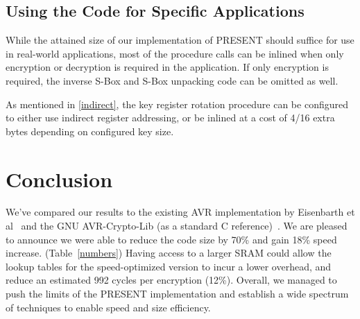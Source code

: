 \documentclass[11pt]{llncs2e} %
\begin{document}
\subsection{Using the Code for Specific Applications}
While the attained size of our implementation of PRESENT should suffice for use in real-world applications, most of the procedure calls can be inlined when only encryption or decryption is required in the application.
If only encryption is required, the inverse S-Box and  S-Box unpacking code can be omitted as well.


As mentioned in \ref{indirect}, the key register rotation procedure can be configured to either use indirect register addressing, or be inlined at a cost of 4/16 extra bytes depending on configured key size.

\section{Conclusion}
We've compared our results to the existing AVR implementation by Eisenbarth et al~\cite{eisenbarth2012compact} and the GNU AVR-Crypto-Lib (as a standard C reference)~\cite{avr_crypto_lib}.
We are pleased to announce we were able to reduce the code size by 70\% and gain 18\% speed increase. (Table~\ref{numbers})
Having access to a larger SRAM could allow the lookup tables for the speed-optimized version to incur a lower overhead, and reduce an estimated 992 cycles per encryption (12\%). 
Overall, we managed to push the limits of the PRESENT implementation and establish a wide spectrum of techniques to enable speed and size efficiency.
\newcommand{\specialcell}[2][c]{%
  \begin{tabular}[#1]{@{}c@{}}#2\end{tabular}}
\end{document}
